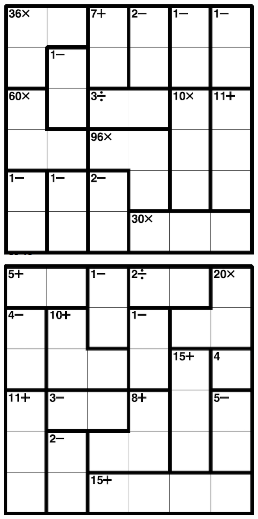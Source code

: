 
\includegraphics[scale=1]{Gambar/Lampiran/6x6_15.png}

\includegraphics[scale=1]{Gambar/Lampiran/6x6_16.png}
